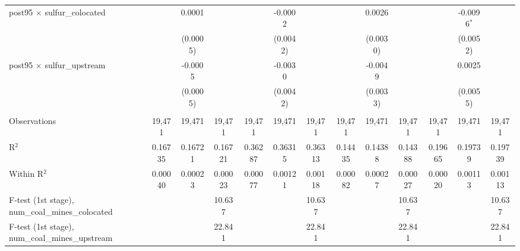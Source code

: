 \begin{table}[htbp]
\begin{adjustbox}{width = \textwidth, center}
\begin{tabular}{lcccccccccccc}
         post95 $\times$ sulfur\_colocated                  &               & 0.0001        &               &               & -0.0002       &               &               & 0.0026        &               &               & -0.0096$^{*}$ &   \\   
                                                            &               & (0.0005)      &               &               & (0.0042)      &               &               & (0.0030)      &               &               & (0.0052)      &   \\   
         post95 $\times$ sulfur\_upstream                   &               & -0.0005       &               &               & -0.0030       &               &               & -0.0049       &               &               & 0.0025        &   \\   
                                                            &               & (0.0005)      &               &               & (0.0042)      &               &               & (0.0033)      &               &               & (0.0055)      &   \\   
          \\
         Observations                                       & 19,471        & 19,471        & 19,471        & 19,471        & 19,471        & 19,471        & 19,471        & 19,471        & 19,471        & 19,471        & 19,471        & 19,471\\  
         R$^2$                                              & 0.16735       & 0.16721       & 0.16721       & 0.36287       & 0.36315       & 0.36313       & 0.14435       & 0.14388       & 0.14388       & 0.19665       & 0.19739       & 0.19739\\  
         Within R$^2$                                       & 0.00040       & 0.00023       & 0.00023       & 0.00077       & 0.00121       & 0.00118       & 0.00082       & 0.00027       & 0.00027       & 0.00020       & 0.00113       & 0.00113\\  
         F-test (1st stage), num\_coal\_mines\_colocated    &               &               & 10.637        &               &               & 10.637        &               &               & 10.637        &               &               & 10.637\\  
         F-test (1st stage), num\_coal\_mines\_upstream     &               &               & 22.841        &               &               & 22.841        &               &               & 22.841        &               &               & 22.841\\  

\end{tabular}
\end{adjustbox}
\end{table}
